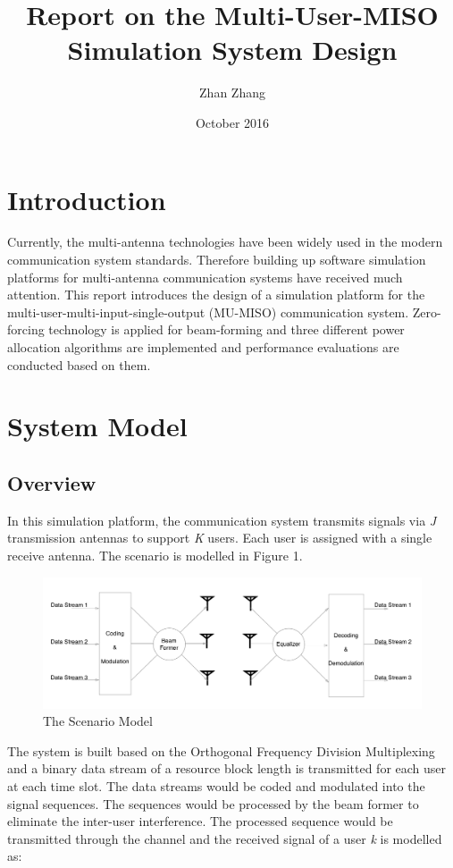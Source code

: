 \documentclass{article}
\title{Report on the Multi-User-MISO Simulation System Design}
\author{Zhan Zhang}
\date{October 2016}
\begin{document}
\maketitle

\section{Introduction}
Currently, the multi-antenna technologies have been widely used in the modern communication system standards.
Therefore building up software simulation platforms for multi-antenna communication systems have received much attention.
This report introduces the design of a simulation platform for
the multi-user-multi-input-single-output (MU-MISO) communication system.
Zero-forcing technology is applied for beam-forming and three different
power allocation algorithms are implemented and performance evaluations are conducted based on them.

\section{System Model}
\subsection{Overview}
In this simulation platform, the communication system transmits signals via \textit{J} transmission antennas to support \textit{K} users.
Each user is assigned with a single receive antenna. The scenario is modelled in Figure 1.
\begin{figure}[ht]
\centering
\includegraphics[scale=0.33]{Scenario.png}
\caption{The Scenario Model}
\label{fig:Scenario}
\end{figure}

\noindent
The system is built based on the Orthogonal Frequency Division Multiplexing and a binary data stream of a resource block length is transmitted for each user at each time slot.
The data streams would be coded and modulated into the signal sequences.
The sequences would be processed by the beam former to eliminate the inter-user interference.
The processed sequence would be transmitted through the channel and the received signal of a user \textit{k} is modelled as:
\end{document}

